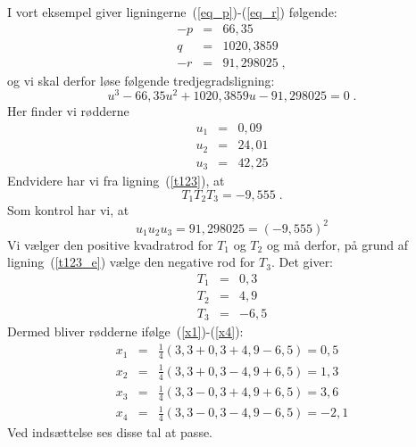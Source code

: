 \documentclass[12pt,oneside,a4paper]{article}
\newcommand{\bea}{\begin{eqnarray}}
\newcommand{\eea}{\end{eqnarray}}
\begin{document}
I vort eksempel giver ligningerne~(\ref{eq_p})-(\ref{eq_r}) følgende:
\bea
-p &=& 66,35 \\
 q &=& 1020,3859 \\
-r &=& 91,298025\;,
\eea
og vi skal derfor løse følgende tredjegradsligning:
\[
    u^3 - 66,35 u^2 + 1020,3859 u - 91,298025 = 0\;.
\]
Her finder vi rødderne
\bea
u_1 &=& 0,09 \\
u_2 &=& 24,01 \\
u_3 &=& 42,25
\eea
Endvidere har vi fra ligning~(\ref{t123}), at
\begin{equation}
T_1 T_2 T_3 = -9,555\;.
\label {t123_e}
\end{equation}
Som kontrol har vi, at 
\begin{equation}
    u_1u_2u_3 = 91,298025 = (-9,555)^2
\end{equation}
Vi vælger den positive kvadratrod for $T_1$ og $T_2$ og må derfor, på grund af
ligning~(\ref{t123_e}) vælge den negative rod for $T_3$.
Det giver:
\bea
T_1 &=& 0,3 \\
T_2 &=& 4,9 \\
T_3 &=& -6,5
\eea
Dermed bliver rødderne ifølge~(\ref{x1})-(\ref{x4}):
\bea
x_1 &=& \frac14(3,3+0,3+4,9-6,5) = 0,5 \\
x_2 &=& \frac14(3,3+0,3-4,9+6,5) = 1,3 \\
x_3 &=& \frac14(3,3-0,3+4,9+6,5) = 3,6 \\
x_4 &=& \frac14(3,3-0,3-4,9-6,5) = -2,1
\eea
Ved indsættelse ses disse tal at passe.
\end{document}
